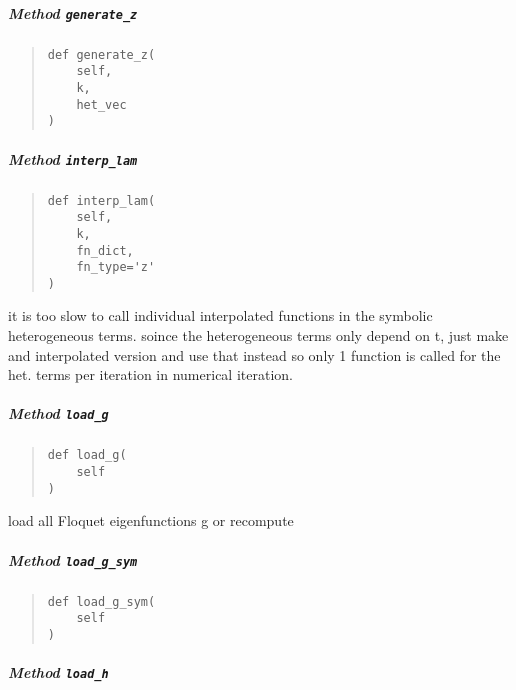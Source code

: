 \documentclass[english,a4paper,oneside]{article}
\let\oldsubparagraph\subparagraph
\renewcommand{\subparagraph}[1]{\oldsubparagraph{#1}\mbox{}}
\begin{document}
\hypertarget{StrongCoupling.StrongCoupling.generate_z}{%
\subparagraph{\texorpdfstring{Method
\texttt{generate\_z}}{Method generate\_z}}\label{StrongCoupling.StrongCoupling.generate_z}}

\begin{quote}
\begin{verbatim}
def generate_z(
    self,
    k,
    het_vec
)
\end{verbatim}
\end{quote}

\hypertarget{StrongCoupling.StrongCoupling.interp_lam}{%
\subparagraph{\texorpdfstring{Method
\texttt{interp\_lam}}{Method interp\_lam}}\label{StrongCoupling.StrongCoupling.interp_lam}}

\begin{quote}
\begin{verbatim}
def interp_lam(
    self,
    k,
    fn_dict,
    fn_type='z'
)
\end{verbatim}
\end{quote}

it is too slow to call individual interpolated functions in the symbolic
heterogeneous terms. soince the heterogeneous terms only depend on t,
just make and interpolated version and use that instead so only 1
function is called for the het. terms per iteration in numerical
iteration.

\hypertarget{StrongCoupling.StrongCoupling.load_g}{%
\subparagraph{\texorpdfstring{Method
\texttt{load\_g}}{Method load\_g}}\label{StrongCoupling.StrongCoupling.load_g}}

\begin{quote}
\begin{verbatim}
def load_g(
    self
)
\end{verbatim}
\end{quote}

load all Floquet eigenfunctions g or recompute

\hypertarget{StrongCoupling.StrongCoupling.load_g_sym}{%
\subparagraph{\texorpdfstring{Method
\texttt{load\_g\_sym}}{Method load\_g\_sym}}\label{StrongCoupling.StrongCoupling.load_g_sym}}

\begin{quote}
\begin{verbatim}
def load_g_sym(
    self
)
\end{verbatim}
\end{quote}

\hypertarget{StrongCoupling.StrongCoupling.load_h}{%
\subparagraph{\texorpdfstring{Method
\texttt{load\_h}}{Method load\_h}}\label{StrongCoupling.StrongCoupling.load_h}}
\end{document}
